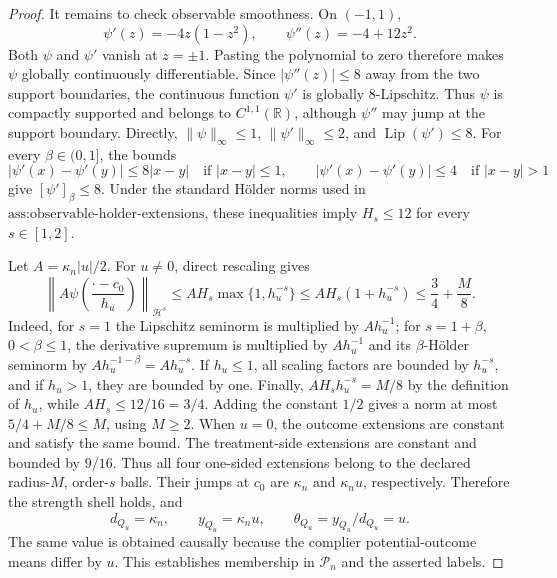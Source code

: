 \documentclass{article}
\begin{document}
\begin{proof}
It remains to check observable smoothness.  On \((-1,1)\),
\[
 \psi'(z)=-4z(1-z^2),
 \qquad
 \psi''(z)=-4+12z^2.
\]
Both \(\psi\) and \(\psi'\) vanish at \(z=\pm1\).  Pasting the
polynomial to zero therefore makes \(\psi\) globally continuously
differentiable.  Since \(|\psi''(z)|\le8\) away from the two support
boundaries, the continuous function \(\psi'\) is globally
\(8\)-Lipschitz.  Thus \(\psi\) is compactly supported and belongs to
\(C^{1,1}(\mathbb R)\), although \(\psi''\) may jump at the support
boundary.  Directly,
\(\|\psi\|_\infty\le1\), \(\|\psi'\|_\infty\le2\), and
\(\operatorname{Lip}(\psi')\le8\).  For every
\(\beta\in(0,1]\), the bounds
\[
 |\psi'(x)-\psi'(y)|
 \le 8|x-y|\quad\text{if }|x-y|\le1,
 \qquad
 |\psi'(x)-\psi'(y)|\le4\quad\text{if }|x-y|>1
\]
give \([\psi']_\beta\le8\).  Under the standard H\"older norms used in
\(\text{ass:observable-holder-extensions}\), these inequalities imply
\(H_s\le12\) for every \(s\in[1,2]\).

Let \(A=\kappa_n|u|/2\).  For \(u\ne0\), direct rescaling gives
\[
 \left\|A\psi\!\left(\frac{\cdot-c_0}{h_u}\right)
 \right\|_{\mathcal H^s}
 \le A H_s\max\{1,h_u^{-s}\}
 \le A H_s(1+h_u^{-s})
 \le \frac34+\frac{M}{8}.
\]
Indeed, for \(s=1\) the Lipschitz seminorm is multiplied by
\(Ah_u^{-1}\); for \(s=1+\beta\), \(0<\beta\le1\), the derivative
supremum is multiplied by \(Ah_u^{-1}\) and its \(\beta\)-H\"older
seminorm by \(Ah_u^{-1-\beta}=Ah_u^{-s}\).  If \(h_u\le1\), all
scaling factors are bounded by \(h_u^{-s}\), and if \(h_u>1\), they are
bounded by one.  Finally,
\(AH_sh_u^{-s}=M/8\) by the definition of \(h_u\), while
\(AH_s\le12/16=3/4\).  Adding the constant \(1/2\) gives a norm at most
\(5/4+M/8\le M\), using \(M\ge2\).  When \(u=0\), the outcome
extensions are constant and satisfy the same bound.  The treatment-side
extensions are constant and bounded by \(9/16\).  Thus all four
one-sided extensions belong to the declared radius-\(M\), order-\(s\)
balls.  Their jumps at \(c_0\) are \(\kappa_n\) and \(\kappa_nu\),
respectively.  Therefore the strength shell holds, and
\[
 d_{Q_u}=\kappa_n,
 \qquad y_{Q_u}=\kappa_nu,
 \qquad \theta_{Q_u}=y_{Q_u}/d_{Q_u}=u.
\]
The same value is obtained causally because the complier
potential-outcome means differ by \(u\).  This establishes membership in
\(\mathcal P_n\) and the asserted labels.


\end{proof}
\end{document}
